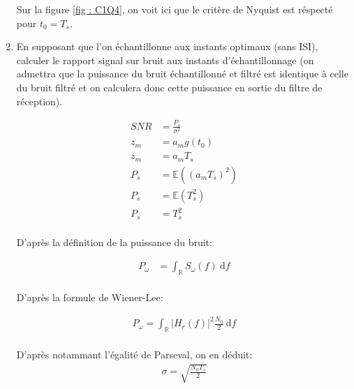 \documentclass[frenchb]{article}
\begin{document}
\begin{enumerate}
        \par\leavevmode\par
        \setlength\parindent{0.5cm}
        Sur la figure \ref{fig : C1Q4}, on voit ici que le critère de Nyquist est réspecté pour $t_0 = T_s$.
         \par\leavevmode\par
        \item En supposant que l'on échantillonne aux instants optimaux (sans ISI), calculer le rapport signal sur bruit aux instants d'échantillonnage (on admettra que la puissance du bruit échantillonné et filtré est identique à celle du bruit filtré et on calculera donc cette puissance en sortie du filtre de réception).
        
        \begin{equation*}
        \begin{split}
        SNR & = \frac{P_s}{\sigma^2} \\        
        z_m &= a_m g(t_0)\\
        z_m & = a_m T_s\\
        P_s & = \mathbb{E}\left(\left(a_m T_s\right)^2\right) \\
        P_s & = \mathbb{E}\left(T_s^2\right) \\
        P_s & = T_s^2 \\
        \end{split}
        \end{equation*}
         
        D'après la définition de la puissance du bruit:
        
        \begin{equation*}
        \begin{split}
        P_{\omega} &= \int_\mathbb{R}S_{\omega}(f) \ \mathrm{d}f \\
        \end{split}
        \end{equation*}
        
        D'après la formule de Wiener-Lee:
        
        \begin{equation*}
        \begin{split}
        P_{\omega} = \int_{\mathbb{R}}|H_r(f)|^2 \frac{N_0}{2} \ \mathrm{d}f \\
        \end{split}
        \end{equation*}
        
        D'après notammant l'égalité de Parseval, on en déduit: 
        \begin{equation*}
        \begin{split}
        \sigma = \sqrt{\frac{N_0 T_s}{2}}  \\
        \end{split}
        \end{equation*}
        

\end{enumerate}
\end{document}
